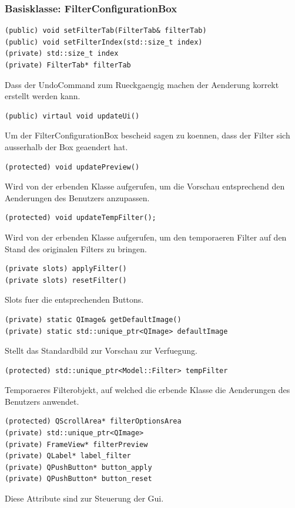 \documentclass[parskip=full]{scrartcl}
\begin{document}
\subsubsection{Basisklasse: FilterConfigurationBox}
\begin{verbatim}(public) void setFilterTab(FilterTab& filterTab)
(public) void setFilterIndex(std::size_t index)
(private) std::size_t index
(private) FilterTab* filterTab
\end{verbatim}
Dass der UndoCommand zum Rueckgaengig machen der Aenderung korrekt erstellt werden kann.
\begin{verbatim}
(public) virtaul void updateUi()
\end{verbatim}
Um der FilterConfigurationBox bescheid sagen zu koennen, dass der Filter sich ausserhalb der Box geaendert hat.
\begin{verbatim}
(protected) void updatePreview()
\end{verbatim}
Wird von der erbenden Klasse aufgerufen, um die Vorschau entsprechend den Aenderungen des Benutzers anzupassen.
\begin{verbatim}
(protected) void updateTempFilter();
\end{verbatim}
Wird von der erbenden Klasse aufgerufen, um den temporaeren Filter auf den Stand des originalen Filters zu bringen.
\begin{verbatim}
(private slots) applyFilter()
(private slots) resetFilter()
\end{verbatim}
Slots fuer die entsprechenden Buttons.
\begin{verbatim}
(private) static QImage& getDefaultImage()
(private) static std::unique_ptr<QImage> defaultImage
\end{verbatim}
Stellt das Standardbild zur Vorschau zur Verfuegung.
\begin{verbatim}
(protected) std::unique_ptr<Model::Filter> tempFilter
\end{verbatim}
Temporaeres Filterobjekt, auf welched die erbende Klasse die Aenderungen des Benutzers anwendet.
\begin{verbatim}
(protected) QScrollArea* filterOptionsArea
(private) std::unique_ptr<QImage>
(private) FrameView* filterPreview
(private) QLabel* label_filter
(private) QPushButton* button_apply
(private) QPushButton* button_reset
\end{verbatim}
Diese Attribute sind zur Steuerung der Gui.
\end{document}
